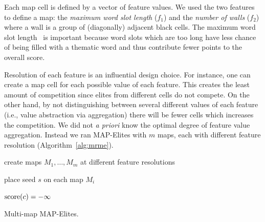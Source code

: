 Each map cell is defined by a vector of feature values. We used the two features to define a map: the {\em maximum word slot length} ($f_1$) and the {\em number of walls} ($f_2$) where a wall is a group of (diagonally) adjacent black cells. The maximum word slot length~\cite{DBLP:conf/cig/BulitkoB21} is important because word slots which are too long have less chance of being filled with a thematic word and thus contribute fewer points to the overall score. 

Resolution of each feature is an influential design choice. For instance, one can create a map cell for each possible value of each feature. This creates the least amount of competition since elites from different cells do not compete. On the other hand, by not distinguishing between several different values of each feature (i.e., value abstraction via aggregation) there will be fewer cells which increases the competition. We did not {\em a priori} know the optimal degree of feature value aggregation. Instead we ran MAP-Elites with $m$ maps, each with different feature resolution (Algorithm~\ref{alg:mrme}). 

\begin{algorithm}[t]
\DontPrintSemicolon 
{

create maps $M_1, \dots, M_m$ at different feature resolutions \; \label{algl:createMaps}

place seed $s$ on each map $M_i$ \; \label{algl:placeInitialSeed}

$\operatorname{score}(c) = -\infty$ \;

 \label{algl:mainLoopE}
}
\caption{\sc Multi-map MAP-Elites.}
\label{alg:mrme}
\end{algorithm}

